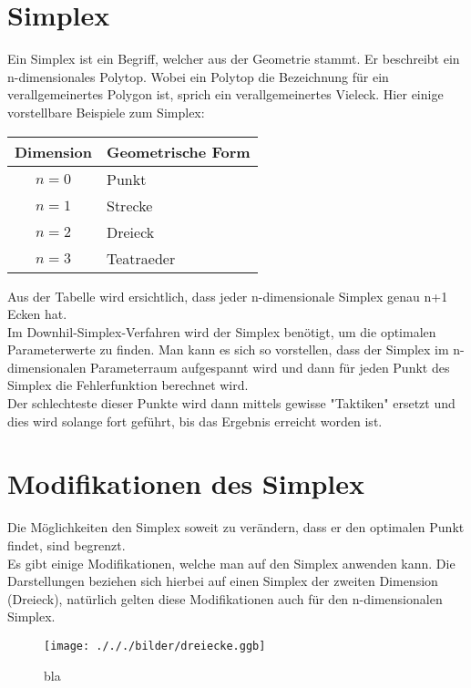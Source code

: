 \section{Simplex}
Ein Simplex ist ein Begriff, welcher aus der Geometrie stammt. Er beschreibt ein n-dimensionales Polytop. Wobei ein Polytop die Bezeichnung für ein verallgemeinertes Polygon ist, sprich ein verallgemeinertes Vieleck. 
Hier einige vorstellbare Beispiele zum Simplex:\\
 
\begin{tabular}{c|l}
Dimension & Geometrische Form\\
\hline
$n=0$ & Punkt\\
$n=1$ & Strecke\\
$n=2$ & Dreieck\\
$n=3$ & Teatraeder
\end{tabular} 

Aus der Tabelle wird ersichtlich, dass jeder n-dimensionale Simplex genau n+1 Ecken hat. \\
Im Downhil-Simplex-Verfahren wird der Simplex benötigt, um die optimalen Parameterwerte zu finden. Man kann es sich so vorstellen, dass der Simplex im n-dimensionalen Parameterraum aufgespannt wird und dann für jeden Punkt des Simplex die Fehlerfunktion berechnet wird. \\
Der schlechteste dieser Punkte wird dann mittels gewisse "Taktiken" ersetzt und dies wird solange fort geführt, bis das Ergebnis erreicht worden ist. 


\section{Modifikationen des Simplex}
Die Möglichkeiten den Simplex soweit zu verändern, dass er den optimalen Punkt findet, sind begrenzt. \\
Es gibt einige Modifikationen, welche man auf den Simplex anwenden kann. Die Darstellungen beziehen sich hierbei auf einen Simplex der zweiten Dimension (Dreieck), natürlich gelten diese Modifikationen auch für den n-dimensionalen Simplex.

\begin{figure}[h]
	\centering
	\texttt{[image: ./././bilder/dreiecke.ggb]}%
  	\caption{bla}%
	\label{fig:Dreiecke}%
\end{figure}


